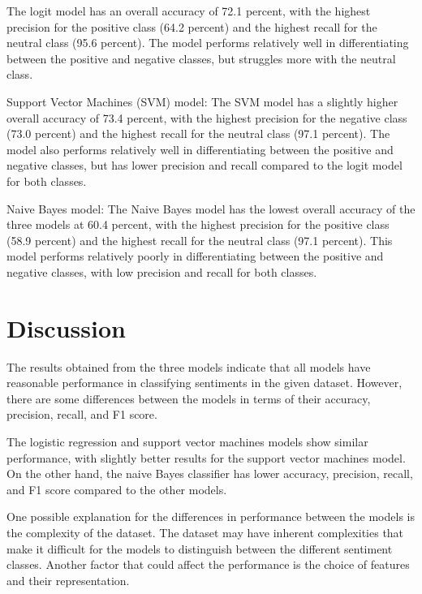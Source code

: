 \documentclass{article}
\begin{document}


The logit model has an overall accuracy of 72.1 percent, with the highest precision for the positive class (64.2 percent) and the highest recall for the neutral class (95.6 percent). The model performs relatively well in differentiating between the positive and negative classes, but struggles more with the neutral class.

 

Support Vector Machines (SVM) model: The SVM model has a slightly higher overall accuracy of 73.4 percent, with the highest precision for the negative class (73.0 percent) and the highest recall for the neutral class (97.1 percent). The model also performs relatively well in differentiating between the positive and negative classes, but has lower precision and recall compared to the logit model for both classes.

 

Naive Bayes model: The Naive Bayes model has the lowest overall accuracy of the three models at 60.4 percent, with the highest precision for the positive class (58.9 percent) and the highest recall for the neutral class (97.1 percent). This model performs relatively poorly in differentiating between the positive and negative classes, with low precision and recall for both classes.



\section{Discussion}
The results obtained from the three models indicate that all models have reasonable performance in classifying sentiments in the given dataset. However, there are some differences between the models in terms of their accuracy, precision, recall, and F1 score.

The logistic regression and support vector machines models show similar performance, with slightly better results for the support vector machines model. On the other hand, the naive Bayes classifier has lower accuracy, precision, recall, and F1 score compared to the other models.

One possible explanation for the differences in performance between the models is the complexity of the dataset. The dataset may have inherent complexities that make it difficult for the models to distinguish between the different sentiment classes. Another factor that could affect the performance is the choice of features and their representation.
\end{document}
